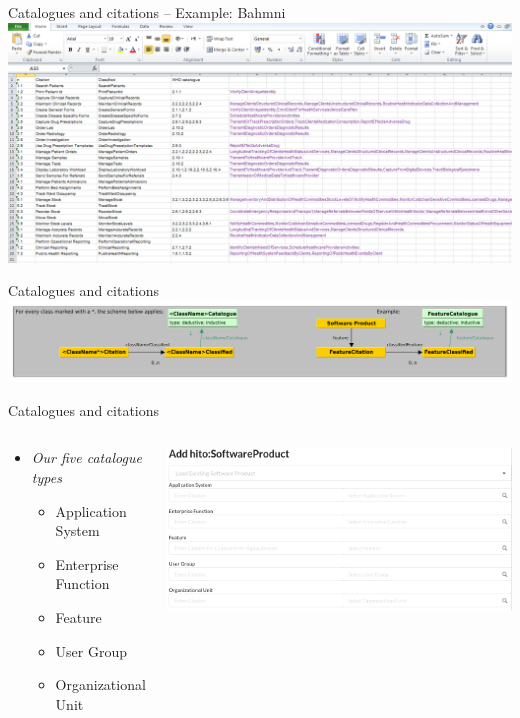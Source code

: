 \documentclass[aspectratio=1610,12pt]{beamer}
\begin{document}
\begin{frame}{Catalogues and citations -- Example: Bahmni}
  \includegraphics[width=\textwidth]{img/bahmni-table2.png}
\end{frame}

\begin{frame}{Catalogues and citations}
\centering
\includegraphics[width=\textwidth]{img/excerpt1.pdf}
\end{frame}

\begin{frame}{Catalogues and citations}
\begin{columns}
  \vspace{-1cm}
  \begin{spacing}{1.25}
    \begin{itemize}
      \item \emph{Our five catalogue types}
      \begin{itemize}
        \item Application System
        \item Enterprise Function
        \item Feature
        \item User Group
        \item Organizational Unit
      \end{itemize}
    \end{itemize}
  \end{spacing}
  \centering
  \includegraphics[width=\textwidth]{img/iglook.png}
\end{columns}
\end{frame}
\end{document}
